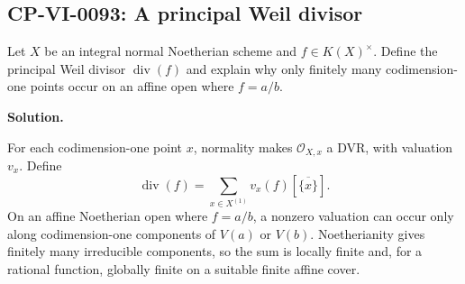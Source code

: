 
\subsection*{CP-VI-0093: A principal Weil divisor}

Let $X$ be an integral normal Noetherian scheme and $f\in K(X)^\times$. Define the principal Weil divisor $\operatorname{div}(f)$ and explain why only finitely many codimension-one points occur on an affine open where $f=a/b$.

\medskip
\noindent\textbf{Solution.}

For each codimension-one point $x$, normality makes $\mathcal O_{X,x}$ a DVR, with valuation $v_x$. Define
\[
\operatorname{div}(f)=\sum_{x\in X^{(1)}}v_x(f)[\overline{\{x\}}].
\]
On an affine Noetherian open where $f=a/b$, a nonzero valuation can occur only along codimension-one components of $V(a)$ or $V(b)$. Noetherianity gives finitely many irreducible components, so the sum is locally finite and, for a rational function, globally finite on a suitable finite affine cover.
